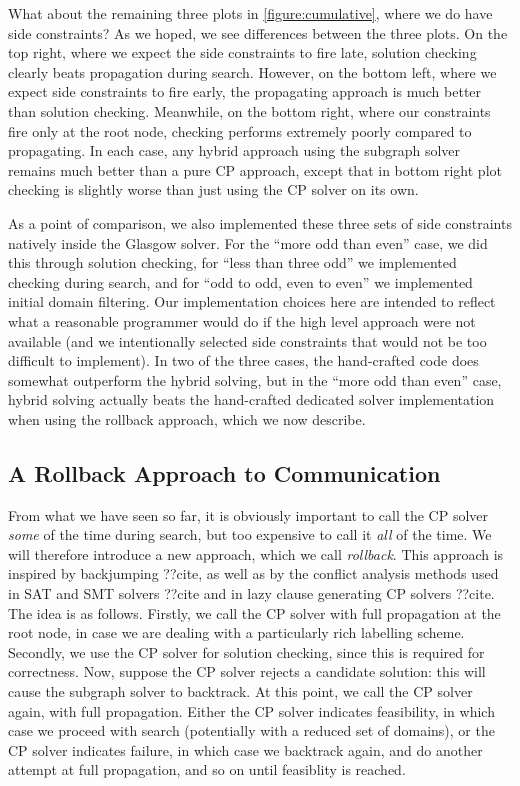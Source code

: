 \documentclass[runningheads]{llncs}
\begin{document}
What about the remaining three plots in \cref{figure:cumulative}, where we do have side constraints?
As we hoped, we see differences between the three plots. On the top right, where we expect the side
constraints to fire late, solution checking clearly beats propagation during search. However, on the
bottom left, where we expect side constraints to fire early, the propagating approach is much better
than solution checking. Meanwhile, on the bottom right, where our constraints fire only at the root
node, checking performs extremely poorly compared to propagating. In each case, any hybrid approach using
the subgraph solver remains much better than a pure CP approach, except that in bottom right plot
checking is slightly worse than just using the CP solver on its own.

As a point of comparison, we also implemented these three sets of side constraints natively inside
the Glasgow solver. For the ``more odd than even'' case, we did this through solution checking, for
``less than three odd'' we implemented checking during search, and for ``odd to odd, even to even''
we implemented initial domain filtering. Our implementation choices here are intended to reflect what a
reasonable programmer would do if the high level approach were not available (and we intentionally
selected side constraints that would not be too difficult to implement). In two of the three cases,
the hand-crafted code does somewhat outperform the hybrid solving, but in the ``more odd than even''
case, hybrid solving actually beats the hand-crafted dedicated solver implementation when using the
rollback approach, which we now describe.

\subsection{A Rollback Approach to Communication}

From what we have seen so far, it is obviously important to call the CP solver \emph{some} of the
time during search, but too expensive to call it \emph{all} of the time. We will therefore introduce
a new approach, which we call \emph{rollback}. This approach is inspired by backjumping ??cite, as
well as by the conflict analysis methods used in SAT and SMT solvers ??cite and in lazy clause
generating CP solvers ??cite. The idea is as follows.  Firstly, we call the CP solver with full
propagation at the root node, in case we are dealing with a particularly rich labelling scheme.
Secondly, we use the CP solver for solution checking, since this is required for correctness. Now,
suppose the CP solver rejects a candidate solution: this will cause the subgraph solver to
backtrack. At this point, we call the CP solver again, with full propagation. Either the CP solver
indicates feasibility, in which case we proceed with search (potentially with a reduced set of
domains), or the CP solver indicates failure, in which case we backtrack again, and do another
attempt at full propagation, and so on until feasiblity is reached.
\end{document}
